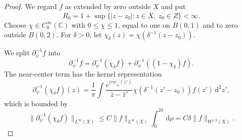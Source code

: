 \documentclass[a4paper,11pt]{article}
\newcommand{\pr}{\partial}
\newcommand{\psiz}{\psi_{z_0}}
\newcommand{\C}{\mathbb{C}}
\newcommand{\dd}{\,\text{d}}
\theoremstyle{plain}
\theoremstyle{definition}
\theoremstyle{remark}
\begin{document}
\begin{proof}
We regard $f$ as extended by zero outside $X$ and put
\begin{equation}
        R_0=1+\sup\{|z-z_0|:z\in\overline{X},\ z_0\in Z\}<\infty.
\end{equation}
Choose $\chi\in C_0^\infty(\C)$ with $0\leq \chi\leq1$, equal to one on $B(0,1)$ and to zero outside $B(0,2)$.  For $\delta>0$, let $\chi_\delta(z)=\chi(\delta^{-1}(z-z_0))$.

We split $\pr_\psi^{-1}f$ into
\begin{equation}
\pr_\psi^{-1} f=\pr_\psi^{-1}(\chi_\delta f)+\pr_\psi^{-1}\left((1-\chi_\delta)f\right).
\end{equation}
The near-center term has the kernel representation
\begin{equation}
\pr_\psi^{-1}(\chi_\delta f)(z)=\frac{1}{\pi}\int \frac{e^{i\tau\psiz(z')}}{\bar z-\bar z'}\chi(\delta^{-1}(z'-z_0))f(z')\dd^2 z',
\end{equation}
which is bounded by
\begin{equation}
\|\pr_\psi^{-1}(\chi_\delta f)\|_{L^\infty(X)}\leq C\|f\|_{L^\infty(X)}\int_0^{2\delta}\dd\rho=C\delta \|f\|_{W^{1,b}(X)}.
\end{equation}


\end{proof}
\end{document}
